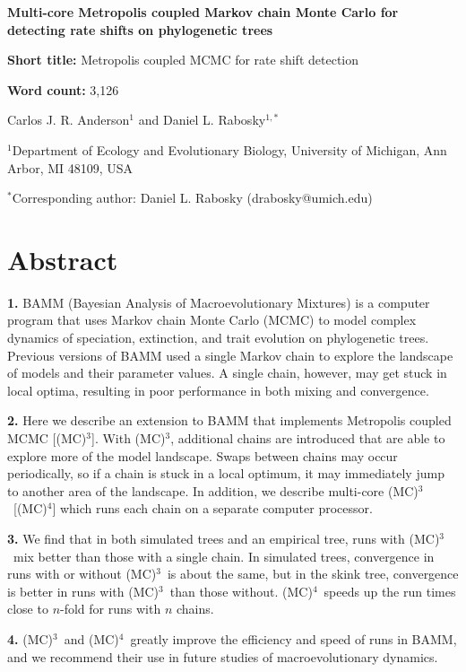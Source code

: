 \documentclass[12pt]{article}
\newcommand{\MCMCMC}{(MC)$^{3}$}
\newcommand{\MCMCMCMC}{(MC)$^{4}$}
\begin{document}
\baselineskip 24pt

\begin{flushleft}

{\Large\textbf{Multi-core Metropolis coupled Markov chain Monte Carlo
    for detecting rate shifts on phylogenetic trees}}

\textbf{Short title:} Metropolis coupled MCMC for rate shift detection

\textbf{Word count:} 3,126

Carlos J. R. Anderson$^{1}$ and
Daniel L. Rabosky$^{1,*}$

$^{1}$Department of Ecology and Evolutionary Biology,
    University of Michigan, Ann Arbor, MI 48109, USA

$^{*}$Corresponding author: Daniel L. Rabosky (drabosky@umich.edu)

\end{flushleft}


\pagebreak[4]


\section*{Abstract}

{\setlength{\parindent}{0cm}

\textbf{1.}
BAMM (Bayesian Analysis of Macroevolutionary Mixtures) is a computer program
that uses Markov chain Monte Carlo (MCMC) to model complex dynamics
of speciation, extinction, and trait evolution on phylogenetic trees.
%
Previous versions of BAMM used a single Markov chain
to explore the landscape of models and their parameter values.
%
A single chain, however, may get stuck in local optima,
resulting in poor performance in both mixing and convergence.

\textbf{2.}
Here we describe an extension to BAMM
that implements Metropolis coupled MCMC [\MCMCMC].
%
With \MCMCMC, additional chains are introduced
that are able to explore more of the model landscape.
%
Swaps between chains may occur periodically,
so if a chain is stuck in a local optimum,
it may immediately jump to another area of the landscape.
%
In addition, we describe multi-core \MCMCMC\ [\MCMCMCMC]
which runs each chain on a separate computer processor.

\textbf{3.}
We find that in both simulated trees and an empirical tree,
runs with \MCMCMC\ mix better than those with a single chain.
%
In simulated trees, convergence in runs with or without \MCMCMC\ 
is about the same, but in the skink tree,
convergence is better in runs with \MCMCMC\ than those without.
%
\MCMCMCMC\ speeds up the run times close to $n$-fold
for runs with $n$ chains.

\textbf{4.}
\MCMCMC\ and \MCMCMCMC\ greatly improve
the efficiency and speed of runs in BAMM,
and we recommend their use in future studies of macroevolutionary dynamics.
}
\end{document}
